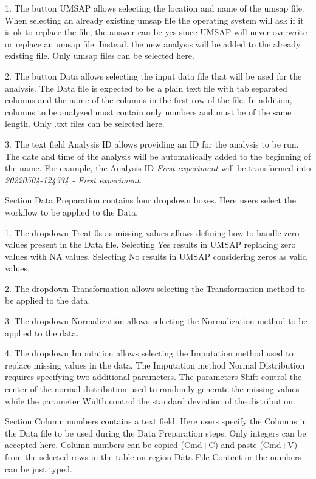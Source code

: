 \num{1}. The button UMSAP allows selecting the location
and name of the umsap file. When selecting an already existing umsap file the operating
system will ask if it is ok to replace the file, the answer can be yes since UMSAP
will never overwrite or replace an umsap file. Instead, the new analysis will be
added to the already existing file. Only umsap files can be selected here.

\num{2}. The button Data allows selecting the input
data file that will be used for the analysis. The Data file is expected to be a
plain text file with tab separated columns and the name of the columns in the first
row of the file. In addition, columns to be analyzed must contain only numbers and
must be of the same length. Only .txt files can be selected here.

\num{3}. The text field Analysis ID allows providing an ID for the analysis
to be run. The date and time of the analysis will be automatically added to the
beginning of the name. For example, the Analysis ID \textit{First experiment} will
be transformed into \textit{20220504-124534 - First experiment}.

Section Data Preparation contains four dropdown boxes. Here users select the workflow
to be applied to the Data.

\num{1}. The dropdown Treat \num{0}s as missing values allows defining how
to handle zero values present in the Data file. Selecting Yes results in UMSAP
replacing zero values with NA values. Selecting No results in UMSAP considering
zeros as valid values.

\num{2}. The dropdown Transformation allows selecting the Transformation method
to be applied to the data.

\num{3}. The dropdown Normalization allows selecting the Normalization method
to be applied to the data.

\num{4}. The dropdown Imputation allows selecting the Imputation method used
to replace missing values in the data. The Imputation method Normal Distribution
requires specifying two additional parameters. The parameters Shift control the
center of the normal distribution used to randomly generate the missing values
while the parameter Width control the standard deviation of the distribution.

Section Column numbers contains a text field. Here users specify the Columns in the
Data file to be used during the Data Preparation steps. Only integers can be accepted
here. Column numbers can be copied (Cmd+C) and paste (Cmd+V) from the selected rows
in the table on region Data File Content or the numbers can be just typed.

